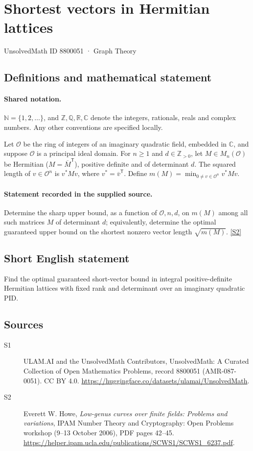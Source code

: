 \documentclass[11pt]{article}
\newcommand{\sref}[2]{\hyperlink{source:#1:#2}{[S#2]}}
\begin{document}
\setcounter{section}{8800050}
\section{Shortest vectors in Hermitian lattices}\label{8800051}
{\small\sffamily UnsolvedMath ID 8800051 · Graph Theory}
\subsection{Definitions and mathematical statement}

\paragraph{Shared notation.}$\mathbb N=\{1,2,\ldots\}$, and $\mathbb Z,\mathbb Q,\mathbb R,\mathbb C$ denote the integers, rationals, reals and complex numbers. Any other conventions are specified locally.


Let $\mathcal O$ be the ring of integers of an imaginary quadratic field, embedded in $\mathbb C$, and suppose $\mathcal O$ is a principal ideal domain. For $n\ge1$ and $d\in\mathbb Z_{>0}$, let $M\in M_n(\mathcal O)$ be Hermitian ($M=\overline M^{\mathsf T}$), positive definite and of determinant $d$. The squared length of $v\in\mathcal O^n$ is $v^*Mv$, where $v^*=\overline v^{\mathsf T}$. Define $m(M)=\min_{0\ne v\in\mathcal O^n}v^*Mv$.
\paragraph{Statement recorded in the supplied source.}
Determine the sharp upper bound, as a function of $\mathcal O,n,d$, on $m(M)$ among all such matrices $M$ of determinant $d$; equivalently, determine the optimal guaranteed upper bound on the shortest nonzero vector length $\sqrt{m(M)}$. \sref{8800051}{2}

\subsection{Short English statement}
Find the optimal guaranteed short-vector bound in integral positive-definite Hermitian lattices with fixed rank and determinant over an imaginary quadratic PID.
\subsection{Sources}
\begin{description}
\item[\hypertarget{source:8800051:1}{S1}] ULAM.AI and the UnsolvedMath Contributors, UnsolvedMath: A Curated Collection of Open Mathematics Problems, record 8800051 (AMR-087-0051). CC BY 4.0. \url{https://huggingface.co/datasets/ulamai/UnsolvedMath}.
\item[\hypertarget{source:8800051:2}{S2}] Everett W. Howe, \emph{Low-genus curves over finite fields: Problems and variations}, IPAM Number Theory and Cryptography: Open Problems workshop (9--13 October 2006), PDF pages 42--45. \url{https://helper.ipam.ucla.edu/publications/SCWS1/SCWS1_6237.pdf}.
\end{description}
\label{end:8800051}
\end{document}
